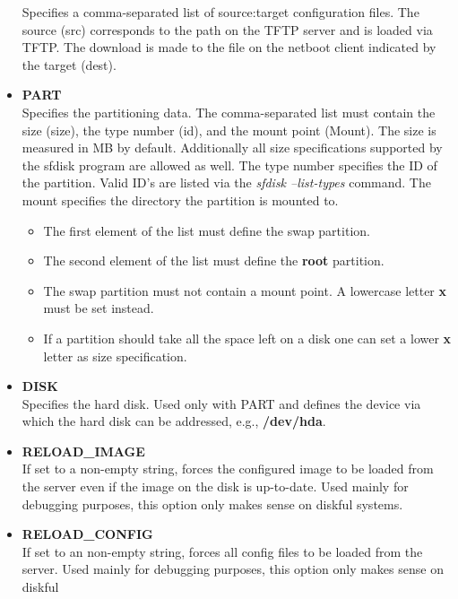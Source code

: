 \begin{itemize}
        Specifies a comma-separated list of source:target
        configuration files. The source (src) corresponds to the path
        on the TFTP server and is loaded via TFTP. The
        download is made to the file on the netboot client
        indicated by the target (dest).
    \item \textbf{PART}\\
        Specifies the partitioning data. The comma-separated list
        must contain the size (size), the type number (id), and the
        mount point (Mount). The size is measured in MB by default.
        Additionally all size specifications supported by the sfdisk
        program are allowed as well. The type number specifies the ID
        of the partition. Valid ID's are listed via the
        \textit{sfdisk --list-types} command. The mount specifies the
        directory the partition is mounted to.
        \begin{itemize}
            \item The first element of the list must define the swap
                  partition.
            \item The second element of the list must define the
                  \textbf{root} partition.
            \item The swap partition must not contain a mount point.
                  A lowercase letter \textbf{x} must be set instead.
            \item If a partition should take all the space left on
                  a disk one can set a lower \textbf{x} letter as
                  size specification.
        \end{itemize}
    \item \textbf{DISK}\\
        Specifies the hard disk. Used only with PART and defines
        the device via which the hard disk can be addressed,
        e.g., \textbf{/dev/hda}.
    \item \textbf{RELOAD\_IMAGE}\\
        If set to a non-empty string, forces the configured
        image to be loaded from the server even if the image on
        the disk is up-to-date. Used mainly for debugging
        purposes, this option only makes sense on diskful
        systems.
    \item \textbf{RELOAD\_CONFIG}\\
        If set to an non-empty string, forces all config files
        to be loaded from the server. Used mainly for debugging
        purposes, this option only makes sense on diskful

\end{itemize}
